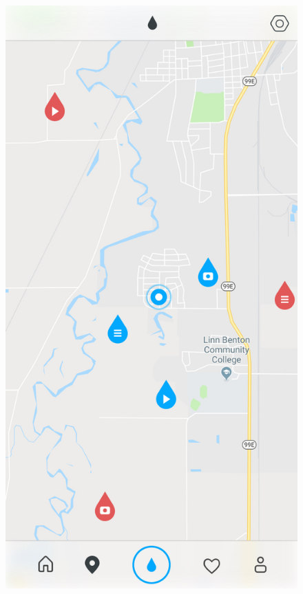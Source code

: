 \documentclass[draftclsnofoot, onecolumn,journal,letterpaper,10pt, compsoc]{IEEEtran}
\begin{document}
\begin{figure}[!htb]
    \includegraphics[scale=.25]{maps.jpg}

\end{figure}
\end{document}
